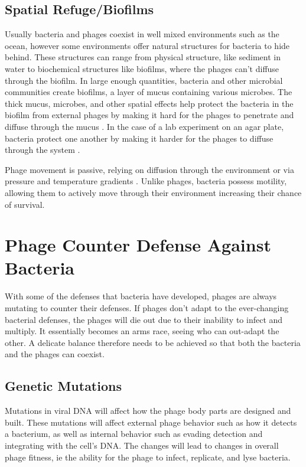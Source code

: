 \subsection{Spatial Refuge/Biofilms} 
Usually bacteria and phages coexist in well mixed environments such as the ocean, however some environments offer natural structures for bacteria to hide behind. 
These structures can range from physical structure, like sediment in water to biochemical structures like biofilms, where the phages can't diffuse through the biofilm. 
In large enough quantities, bacteria and other microbial communities create biofilms, a layer of mucus containing various microbes. 
The thick mucus, microbes, and other spatial effects help protect the bacteria in the biofilm from external phages by making it hard for the phages to penetrate and diffuse through the mucus \cite{abedonPhageDelayEnhancing2017}. 
In the case of a lab experiment on an agar plate, bacteria protect one another by making it harder for the phages to diffuse through the system \cite{eriksenGrowingMicrocolonyCan2018}. 

Phage movement is passive, relying on diffusion through the environment or via pressure and temperature gradients \cite{lohrmannInfluenceBacterialSwimming2024}. 
Unlike phages, bacteria possess motility, allowing them to actively move through their environment increasing their chance of survival. 

\section{Phage Counter Defense Against Bacteria}
With some of the defenses that bacteria have developed, phages are always mutating to counter their defenses. 
If phages don't adapt to the ever-changing bacterial defenses, the phages will die out due to their inability to infect and multiply. 
It essentially becomes an arms race, seeing who can out-adapt the other. 
A delicate balance therefore needs to be achieved so that both the bacteria and the phages can coexist. 

\subsection{Genetic Mutations}
Mutations in viral DNA will affect how the phage body parts are designed and built. 
These mutations will affect external phage behavior such as how it detects a bacterium, as well as internal behavior such as evading detection and integrating with the cell's DNA. 
The changes will lead to changes in overall phage fitness, ie the ability for the phage to infect, replicate, and lyse bacteria. 

